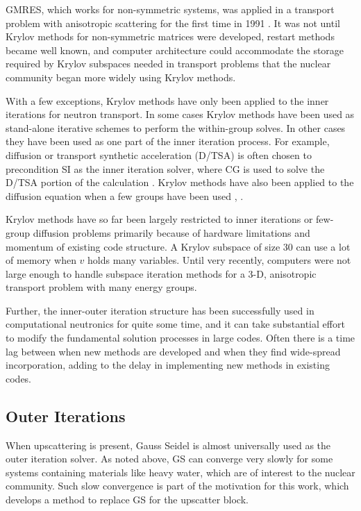 GMRES, which works for non-symmetric systems, was applied in a transport problem with anisotropic scattering for the first time in 1991 \cite{Adams2002}. It was not until Krylov methods for non-symmetric matrices were developed, restart methods became well known, and computer architecture could accommodate the storage required by Krylov subspaces needed in transport problems that the nuclear community began more widely using Krylov methods. 

With a few exceptions, Krylov methods have only been applied to the inner iterations for neutron transport. In some cases Krylov methods have been used as stand-alone iterative schemes to perform the within-group solves. In other cases they have been used as one part of the inner iteration process. For example, diffusion or transport synthetic acceleration (D/TSA) is often chosen to precondition SI as the inner iteration solver, where CG is used to solve the D/TSA portion of the calculation \cite{Gupta2004}. Krylov methods have also been applied to the diffusion equation when a few groups have been used \cite{Suetomi1988}, \cite{Verdu1999}.

Krylov methods have so far been largely restricted to inner iterations or few-group diffusion problems primarily because of hardware limitations and momentum of existing code structure. A Krylov subspace of size 30 can use a lot of memory when $v$ holds many variables. Until very recently, computers were not large enough to handle subspace iteration methods for a 3-D, anisotropic transport problem with many energy groups.  

Further, the inner-outer iteration structure has been successfully used in computational neutronics for quite some time, and it can take substantial effort to modify the fundamental solution processes in large codes. Often there is a time lag between when new methods are developed and when they find wide-spread incorporation, adding to the delay in implementing new methods in existing codes.

\subsection{Outer Iterations}
When upscattering is present, Gauss Seidel is almost universally used as the outer iteration solver. As noted above, GS can converge very slowly for some systems containing materials like heavy water, which are of interest to the nuclear community. Such slow convergence is part of the motivation for this work, which develops a method to replace GS for the upscatter block. 

